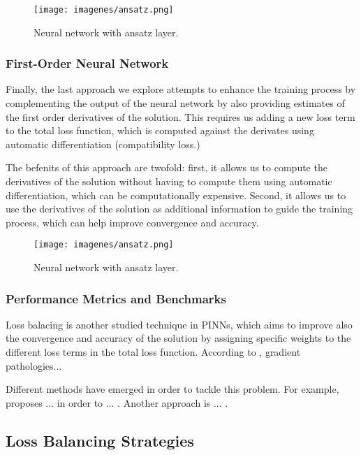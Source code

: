 \documentclass[12pt]{report} %
\theoremstyle{plain}           %
\theoremstyle{definition}      %
\theoremstyle{remark}          %
\begin{document}
\begin{figure}[H]
	\centering
	\texttt{[image: imagenes/ansatz.png]}
	\caption{Neural network with ansatz layer.}
	\label{fig:ansatz}
\end{figure}

\subsubsection{First-Order Neural Network}

Finally, the last approach we explore attempts to enhance the training process by complementing the output
of the neural network by also providing estimates of the first order derivatives of the solution. This
requires us adding a new loss term to the total loss function, which is computed against
the derivates using automatic differentiation (compatibility loss.)

The befenits of this approach are twofold: first, it allows us to
compute the derivatives of the solution without having to compute them using automatic differentiation,
which can be computationally expensive. Second, it allows us to use the derivatives of the solution
as additional information to guide the training process, which can help improve convergence and accuracy.

\begin{figure}[H]
	\centering
	\texttt{[image: imagenes/ansatz.png]}
	\caption{Neural network with ansatz layer.}
	\label{fig:ansatz}
\end{figure}

\subsubsection{Performance Metrics and Benchmarks}

Loss balacing is another studied technique in PINNs, which aims to 
improve also the convergence and accuracy of the solution by assigning specific weights to the 
different loss terms in the total loss function. According to \cite{wang2023expertsguidetrainingphysicsinformed},
gradient pathologies... 

Different methods have emerged in order to tackle this problem. For example, \cite{} proposes ...
in order to ... . Another approach is ... .

\subsection{Loss Balancing Strategies}
\end{document}
